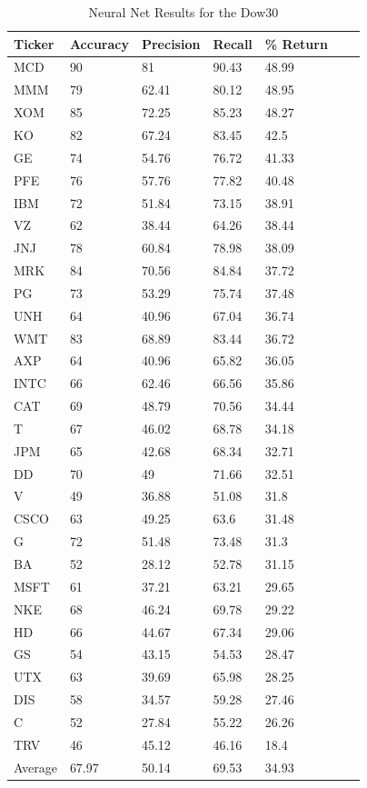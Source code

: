 \documentclass{article}
\begin{document}
\begin{table}[h!]
  \begin{tabular}{@{}lllllll@{}}
    \toprule
    Ticker & Accuracy & Precision & Recall & \% Return & \\ \midrule
    MCD & 90 & 81 & 90.43 & 48.99 & \\
    MMM & 79 & 62.41 & 80.12 & 48.95 & \\
    XOM & 85 & 72.25 & 85.23 & 48.27 & \\
    KO & 82 & 67.24 & 83.45 & 42.5 & \\
    GE & 74 & 54.76 & 76.72 & 41.33 & \\
    PFE & 76 & 57.76 & 77.82 & 40.48 & \\
    IBM & 72 & 51.84 & 73.15 & 38.91 & \\
    VZ & 62 & 38.44 & 64.26 & 38.44 & \\
    JNJ & 78 & 60.84 & 78.98 & 38.09 & \\
    MRK & 84 & 70.56 & 84.84 & 37.72 & \\
    PG & 73 & 53.29 & 75.74 & 37.48 & \\
    UNH & 64 & 40.96 & 67.04 & 36.74 & \\
    WMT & 83 & 68.89 & 83.44 & 36.72 & \\
    AXP & 64 & 40.96 & 65.82 & 36.05 & \\
    INTC & 66 & 62.46 & 66.56 & 35.86 & \\
    CAT & 69 & 48.79 & 70.56 & 34.44 & \\
    T & 67 & 46.02 & 68.78 & 34.18 & \\
    JPM & 65 & 42.68 & 68.34 & 32.71 & \\
    DD & 70 & 49 & 71.66 & 32.51 & \\
    V & 49 & 36.88 & 51.08 & 31.8 & \\
    CSCO & 63 & 49.25 & 63.6 & 31.48 & \\
    G & 72 & 51.48 & 73.48 & 31.3 & \\
    BA & 52 & 28.12 & 52.78 & 31.15 & \\
    MSFT & 61 & 37.21 & 63.21 & 29.65 & \\
    NKE & 68 & 46.24 & 69.78 & 29.22 & \\
    HD & 66 & 44.67 & 67.34 & 29.06 & \\
    GS & 54 & 43.15 & 54.53 & 28.47 & \\
    UTX & 63 & 39.69 & 65.98 & 28.25 & \\
    DIS & 58 & 34.57 & 59.28 & 27.46 & \\
    C & 52 & 27.84 & 55.22 & 26.26 & \\
    TRV & 46 & 45.12 & 46.16 & 18.4 & \\ \bottomrule
    Average & 67.97 & 50.14 & 69.53 & 34.93 & \\
  \end{tabular}
  \caption{Neural Net Results for the Dow30}
  \label{my-label}
\end{table}
\end{document}
